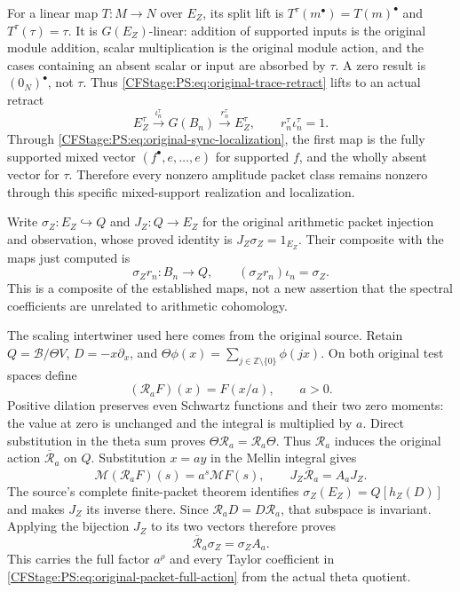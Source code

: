 For a linear map $T:M\to N$ over $E_Z$, its split lift is
$T^\tau(m^\bullet)=T(m)^\bullet$ and $T^\tau(\tau)=\tau$.
It is $G(E_Z)$-linear: addition of supported inputs is the original
module addition, scalar multiplication is the original module action,
and the cases containing an absent scalar or input are absorbed by
$\tau$. A zero result is $(0_N)^\bullet$, not $\tau$.
Thus \eqref{CFStage:PS:eq:original-trace-retract} lifts to an actual retract
\begin{equation}
 E_Z^\tau\xrightarrow{\iota_n^\tau}G(B_n)
 \xrightarrow{r_n^\tau}E_Z^\tau,
 \qquad r_n^\tau\iota_n^\tau=1.
 \label{CFStage:PS:eq:original-split-retract}
\end{equation}
Through \eqref{CFStage:PS:eq:original-sync-localization}, the first map is the
fully supported mixed vector $(f^\bullet,e,\ldots,e)$ for supported
$f$, and the wholly absent vector for $\tau$. Therefore every
nonzero amplitude packet class remains nonzero through this specific
mixed-support realization and localization.

Write $\sigma_Z:E_Z\hookrightarrow Q$ and $J_Z:Q\to E_Z$ for
the original arithmetic packet injection and observation, whose
proved identity is $J_Z\sigma_Z=1_{E_Z}$. Their composite with the
maps just computed is
\[
 \sigma_Zr_n:B_n\longrightarrow Q,\qquad
 (\sigma_Zr_n)\iota_n=\sigma_Z.
\]
This is a composite of the established maps, not a new assertion that
the spectral coefficients are unrelated to arithmetic cohomology.

The scaling intertwiner used here comes from the original source.
Retain $Q=\mathscr B/\Theta V$, $D=-x\partial_x$, and
$\Theta\phi(x)=\sum_{j\in\mathbb Z\setminus\{0\}}\phi(jx)$.
On both original test spaces define
\[
 (\mathcal R_aF)(x)=F(x/a),\qquad a>0.
\]
Positive dilation preserves even Schwartz functions and their two
zero moments: the value at zero is unchanged and the integral is
multiplied by $a$. Direct substitution in the theta sum proves
$\Theta\mathcal R_a=\mathcal R_a\Theta$.
Thus $\mathcal R_a$ induces the original action $\overline{\mathcal R}_a$
on $Q$. Substitution $x=ay$ in the Mellin integral gives
\[
 \mathcal M(\mathcal R_aF)(s)=a^s\mathcal MF(s),\qquad
 J_Z\overline{\mathcal R}_a=A_aJ_Z.
\]
The source's complete finite-packet theorem identifies
$\sigma_Z(E_Z)=Q[h_Z(D)]$ and makes $J_Z$ its inverse there.
Since $\mathcal R_aD=D\mathcal R_a$, that subspace is invariant.
Applying the bijection $J_Z$ to its two vectors therefore proves
\[
 \overline{\mathcal R}_a\sigma_Z=\sigma_ZA_a.
\]
This carries the full factor $a^\rho$ and every Taylor coefficient in
\eqref{CFStage:PS:eq:original-packet-full-action} from the actual theta quotient.

